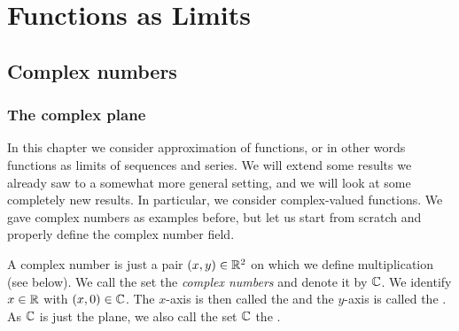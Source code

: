 
\chapter{Functions as Limits} \label{approx:chapter}


\section{Complex numbers}
\label{sec:complexnums}



\subsection{The complex plane}

In this chapter we consider approximation of functions, or in other words
functions as limits of sequences and series.
We will extend some results we already saw to a somewhat more
general setting, and we will look at some completely new results.
In particular, we consider complex-valued functions.
We gave complex numbers as examples before, but
let us start from scratch and properly define the complex number field.

A complex number is just a pair $(x,y) \in {\mathbb{R}}^2$ on which we define
multiplication (see below).
We call the set the \emph{complex numbers}
and denote it by ${\mathbb{C}}$.
We identify $x \in {\mathbb{R}}$ with $(x,0) \in {\mathbb{C}}$.
The $x$-axis is then called the \emph{} and the $y$-axis is
called the \emph{}.
As ${\mathbb{C}}$ is just the plane, we also call the set ${\mathbb{C}}$ the
\emph{}.


